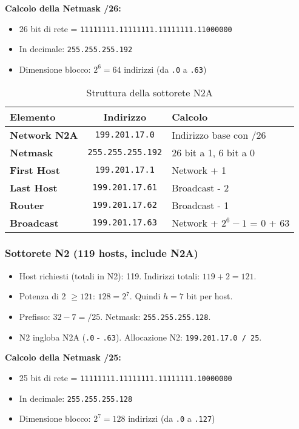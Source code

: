 \textbf{Calcolo della Netmask /26:}
\begin{itemize}
    \item 26 bit di rete = \texttt{11111111.11111111.11111111.11000000}
    \item In decimale: \texttt{255.255.255.192}
    \item Dimensione blocco: $2^6 = 64$ indirizzi (da \texttt{.0} a \texttt{.63})
\end{itemize}

\begin{table}[h]
\centering
\begin{tabular}{|l|c|l|}
\hline
\rowcolor{bg_custom}
\textcolor{primarytext}{\textbf{Elemento}} & \textcolor{primarytext}{\textbf{Indirizzo}} & \textcolor{primarytext}{\textbf{Calcolo}} \\
\hline
\textbf{Network N2A} & \texttt{199.201.17.0} & Indirizzo base con /26 \\
\hline
\textbf{Netmask} & \texttt{255.255.255.192} & 26 bit a 1, 6 bit a 0 \\
\hline
\textbf{First Host} & \texttt{199.201.17.1} & Network + 1 \\
\hline
\textbf{Last Host} & \texttt{199.201.17.61} & Broadcast - 2 \\
\hline
\textbf{Router} & \texttt{199.201.17.62} & Broadcast - 1 \\
\hline
\textbf{Broadcast} & \texttt{199.201.17.63} & Network + $2^6 - 1$ = 0 + 63 \\
\hline
\end{tabular}
\caption{Struttura della sottorete N2A}
\end{table}

\subsubsection{Sottorete N2 (119 hosts, include N2A)}
\begin{itemize}
    \item Host richiesti (totali in N2): 119. Indirizzi totali: $119 + 2 = 121$.
    \item Potenza di 2 $\geq 121$: $128 = 2^7$. Quindi $h=7$ bit per host.
    \item Prefisso: $32 - 7 = /25$. Netmask: \texttt{255.255.255.128}.
    \item N2 ingloba N2A (\texttt{.0} - \texttt{.63}). Allocazione N2: \texttt{199.201.17.0 / 25}.
\end{itemize}

\textbf{Calcolo della Netmask /25:}
\begin{itemize}
    \item 25 bit di rete = \texttt{11111111.11111111.11111111.10000000}
    \item In decimale: \texttt{255.255.255.128}
    \item Dimensione blocco: $2^7 = 128$ indirizzi (da \texttt{.0} a \texttt{.127})
\end{itemize}


